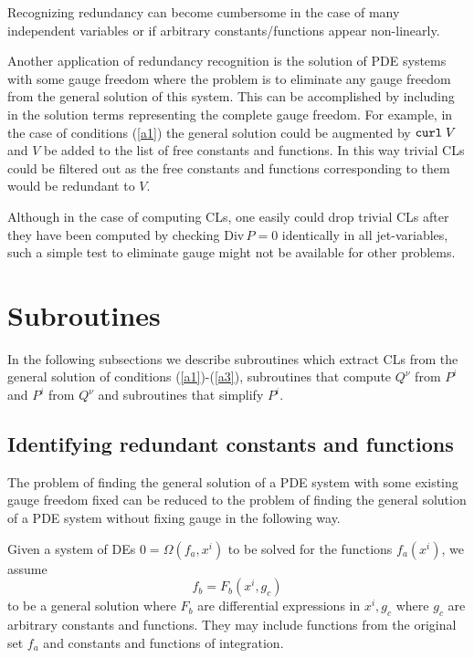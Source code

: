 Recognizing redundancy can become cumbersome in the case of many
independent variables or if arbitrary constants/functions appear 
non-linearly.

Another application of redundancy recognition is the solution of
PDE systems with some gauge freedom where the problem is to eliminate
any gauge freedom from the general solution of this system. This
can be accomplished by including in the solution
terms representing the complete gauge freedom.
For example, in the case of conditions (\ref{a1}) the general
solution could be augmented by ${\tt curl}\; V$ and $V$ be added
to the list of free constants and functions. 
In this way trivial CLs could be filtered
out as the free constants and functions corresponding to them
would be redundant to $V$.

Although in the case of computing CLs, one easily could drop
trivial CLs after they have been computed by checking
$\mbox{Div}\,P = 0$ identically in all jet-variables,
such a simple test to eliminate gauge might not be available
for other problems.

\section{Subroutines}
In the following subsections we describe subroutines which
extract CLs from the general solution of conditions 
(\ref{a1})-(\ref{a3}), subroutines that compute $Q^{\nu}$ from
$P^i$ and $P^i$ from $Q^{\nu}$ and subroutines that simplify $P^i$.

\subsection{Identifying redundant constants and functions}
The problem of finding the general solution of a PDE system with
some existing gauge freedom fixed can be reduced to the problem 
of finding the general solution of a PDE system without fixing
gauge in the following way.

Given a system of DEs $0 = \Omega(f_a,x^i)$ to be solved for the
functions $f_a(x^i)$, we assume 
\begin{equation}
f_b = F_b(x^i,g_c) \label{c0} 
\end{equation}
to be a general solution where $F_b$ are differential expressions in 
$x^i,g_c$ where $g_c$ are arbitrary constants and functions.
They may include functions from the original set $f_a$  
and constants and functions of integration.

